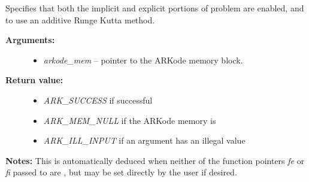 \documentclass[letterpaper,10pt,english]{sphinxmanual}
\begin{document}
\begin{fulllineitems}
\label{c_interface/User_callable:ARKodeSetImEx}
Specifies that both the implicit and explicit portions
of problem are enabled, and to use an additive Runge Kutta method.
\begin{description}
\item[{\textbf{Arguments:}}] \leavevmode\begin{itemize}
\item {} 
\emph{arkode\_mem} -- pointer to the ARKode memory block.

\end{itemize}

\item[{\textbf{Return value:}}] \leavevmode\begin{itemize}
\item {} 
\emph{ARK\_SUCCESS} if successful

\item {} 
\emph{ARK\_MEM\_NULL} if the ARKode memory is 

\item {} 
\emph{ARK\_ILL\_INPUT} if an argument has an illegal value

\end{itemize}

\end{description}

\textbf{Notes:} This is automatically deduced when neither of the function
pointers \emph{fe} or \emph{fi} passed to {\hyperref[c_interface/User_callable:ARKodeInit]{}} are , but
may be set directly by the user if desired.

\end{fulllineitems}

\end{document}
